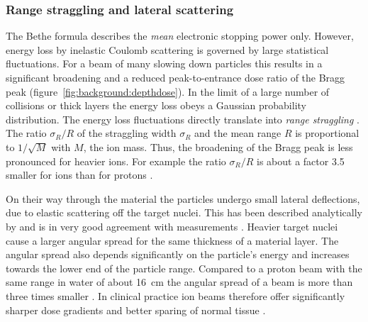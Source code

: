 %
%

\subsubsection{Range straggling and lateral scattering}
The Bethe formula describes the \emph{mean} electronic stopping power
only. However, energy loss by inelastic Coulomb scattering is governed
by large statistical fluctuations. For a beam of many slowing down
particles this results in a significant broadening and a reduced
peak-to-entrance dose ratio of the Bragg peak
(figure~\ref{fig:background:depthdose}). In the limit of a large
number of collisions or thick layers the energy loss obeys a Gaussian
probability distribution. The energy loss fluctuations directly
translate into \emph{range straggling} \citep{Bohr1940,Ahlen1980}. The
ratio $\sigma_R/R$ of the straggling width $\sigma_R$ and the mean
range $R$ is proportional to $1/\sqrt{M}$ with $M$, the ion
mass. Thus, the broadening of the Bragg peak is less pronounced for
heavier ions. For example the ratio $\sigma_R/R$ is about a factor 3.5
smaller for \Ctw ions than for protons \citep{Schardt2010}.

% 
%

On their way through the material the particles undergo small lateral
deflections, due to elastic scattering off the target nuclei. This has
been described analytically by \citet{Moliere1948} and is in very good
agreement with measurements \citep{Gottschalk1993}. Heavier target
nuclei cause a larger angular spread for the same thickness of a
material layer. The angular spread also depends significantly on the
particle's energy and increases towards the lower end of the particle
range. Compared to a proton beam with the same range in water of about
\SI{16}{\centi\meter} the angular spread of a \Ctw beam is more than
three times smaller \citep{Schardt2010}. In clinical practice ion
beams therefore offer significantly sharper dose gradients and better
sparing of normal tissue \citep{Weber2009}.


